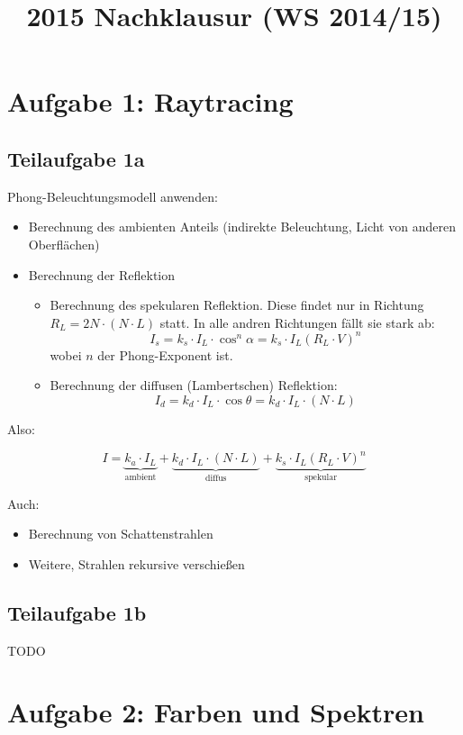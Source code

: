 \documentclass[a4paper]{scrartcl}
\begin{document}
\title{2015 Nachklausur (WS 2014/15)}

\setcounter{section}{1}
\section*{Aufgabe 1: Raytracing}
\subsection*{Teilaufgabe 1a}
Phong-Beleuchtungsmodell anwenden:

\begin{itemize}
    \item Berechnung des ambienten Anteils (indirekte Beleuchtung, Licht von anderen Oberflächen)
    \item Berechnung der Reflektion
    \begin{itemize}
        \item Berechnung des spekularen Reflektion. Diese findet nur in Richtung
              $R_L = 2 N \cdot (N \cdot L)$ statt. In alle andren Richtungen
              fällt sie stark ab:
              \[I_s = k_s \cdot I_L \cdot \cos^n \alpha = k_s \cdot I_L (R_L \cdot V)^n\]
              wobei $n$ der Phong-Exponent ist.
        \item Berechnung der diffusen (Lambertschen) Reflektion:
              \[I_d = k_d \cdot I_L \cdot \cos \theta = k_d \cdot I_L \cdot (N \cdot L) \]
    \end{itemize}
\end{itemize}

Also:

\[I = \underbrace{k_a \cdot I_L}_{\text{ambient}} + \underbrace{k_d \cdot I_L \cdot (N \cdot L)}_{\text{diffus}} + \underbrace{k_s \cdot I_L (R_L \cdot V)^n}_{\text{spekular}}\]

Auch:

\begin{itemize}
    \item Berechnung von Schattenstrahlen
    \item Weitere, Strahlen rekursive verschießen
\end{itemize}


\subsection*{Teilaufgabe 1b}
TODO

\section*{Aufgabe 2: Farben und Spektren}
\end{document}
